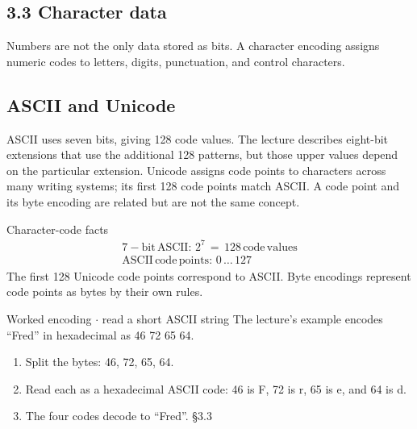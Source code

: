 \documentclass[11pt]{article}
\begin{document}
\begin{keepsection}
\section{3.3 Character data}

Numbers are not the only data stored as bits. A character encoding assigns numeric codes to letters, digits, punctuation, and control characters.

\begin{keepsection}
\subsection{ASCII and Unicode}

ASCII uses seven bits, giving 128 code values. The lecture describes eight-bit extensions that use the additional 128 patterns, but those upper values depend on the particular extension. Unicode assigns code points to characters across many writing systems; its first 128 code points match ASCII. A code point and its byte encoding are related but are not the same concept.

\begin{equationcard}{Character-code facts}
\[ \begin{gathered} 7-\text{bit}\, \text{ASCII}:\, 2^{7}\, =\, 128\, \text{code}\, \text{values} \\ \text{ASCII}\, \text{code}\, \text{points}:\, 0\, …\, 127 \end{gathered} \]
{\small The first 128 Unicode code points correspond to ASCII. Byte encodings represent code points as bytes by their own rules.}
\end{equationcard}

\begin{workedbox}{Worked encoding \ensuremath{\cdot} read a short ASCII string}
The lecture’s example encodes “Fred” in hexadecimal as 46 72 65 64.

\begin{enumerate}
\item Split the bytes: 46, 72, 65, 64.
\item Read each as a hexadecimal ASCII code: 46 is F, 72 is r, 65 is e, and 64 is d.
\item The four codes decode to “Fred”. \hfill{\small\color{FAUblue}§3.3}
\end{enumerate}
\end{workedbox}


\end{keepsection}
\end{keepsection}
\end{document}
